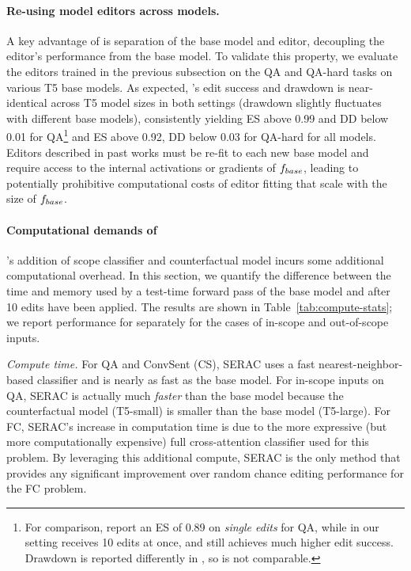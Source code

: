 \documentclass{article}
\begin{document}
\paragraph{Re-using model editors across models.}
A key advantage of {\name} is separation of the base model and editor, decoupling the editor's performance from the base model. To validate this property, we evaluate the {\name} editors trained in the previous subsection on the QA and QA-hard tasks on various T5 base models. As expected, {\name}'s edit success and drawdown is near-identical across T5 model sizes in both settings (drawdown slightly fluctuates with different base models), consistently yielding ES above 0.99 and DD below 0.01 for QA\footnote{For comparison, \citet{mitchell2021fast} report an ES of 0.89 on \textit{single edits} for QA, while in our setting {\name} receives 10 edits at once, and still achieves much higher edit success. Drawdown is reported differently in \citet{mitchell2021fast}, so is not comparable.} and ES above 0.92, DD below 0.03 for QA-hard for all models. Editors described in past works must be re-fit to each new base model \citep{Sinitsin2020Editable,Cao2021EditingFK,mitchell2021fast,meng2022locating} and require access to the internal activations or gradients of $f_{base}$, leading to potentially prohibitive computational costs of editor fitting that scale with the size of $f_{base}$.

\paragraph{Computational demands of {\name}}

{\name}'s addition of scope classifier and counterfactual model incurs some additional computational overhead. In this section, we quantify the difference between the time and memory used by a test-time forward pass of the base model and {\name} after 10 edits have been applied. The results are shown in Table~\ref{tab:compute-stats}; we report performance for {\name} separately for the cases of in-scope and out-of-scope inputs.

\textit{Compute time.} For QA and ConvSent (CS), SERAC uses a fast nearest-neighbor-based classifier and is nearly as fast as the base model. For in-scope inputs on QA, SERAC is actually much \textit{faster} than the base model because the counterfactual model (T5-small) is smaller than the base model (T5-large). For FC, SERAC's increase in computation time is due to the more expressive (but more computationally expensive) full cross-attention classifier used for this problem. By leveraging this additional compute, SERAC is the only method that provides any significant improvement over random chance editing performance for the FC problem. 
\end{document}
